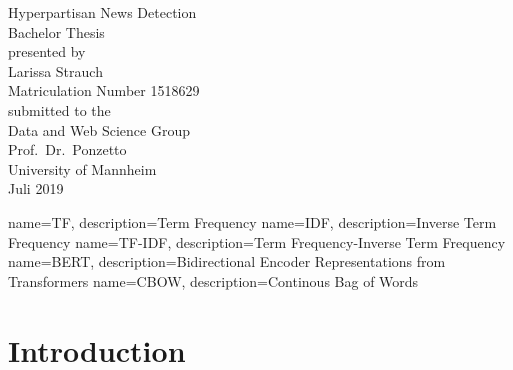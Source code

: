 \documentclass[a4paper, 11pt,titlepage,oneside,openany]{book}
\begin{document}
\begin{titlepage}
	\vspace*{2cm}
  \begin{center}
   {\Large Hyperpartisan News Detection\\}
   \vspace{2cm} 
   {Bachelor Thesis\\}
   \vspace{2cm}
   {presented by\\
    Larissa Strauch \\
    Matriculation Number 1518629\\
   }
   \vspace{1cm} 
   {submitted to the\\
    Data and Web Science Group\\
    Prof.\ Dr.\ Ponzetto\\
    University of Mannheim\\} \vspace{2cm}
   {Juli 2019}
  \end{center}
\end{titlepage} 

\tableofcontents
\newpage

\listofalgorithms

\listoffigures

\listoftables

{
	name=TF,
	description={Term Frequency}
}
{
	name=IDF,
	description={Inverse Term Frequency}
}
{
	name=TF-IDF,
	description={Term Frequency-Inverse Term Frequency}
}
{
	name=BERT,
	description={Bidirectional Encoder Representations from Transformers}
}
{
	name=CBOW,
	description={Continous Bag of Words}
}


\printglossaries %


\newpage



\chapter{Introduction}
\end{document}

